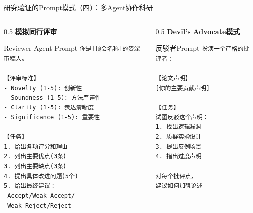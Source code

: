 \documentclass[aspectratio=169,11pt]{beamer}
\begin{document}
\begin{frame}[fragile]{研究验证的Prompt模式（四）：多Agent协作科研}
    \begin{columns}
        \begin{column}{0.5\textwidth}
            \textbf{模拟同行评审}
            \begin{exampleblock}{Reviewer Agent Prompt}
                \scriptsize
                \texttt{你是[顶会名称]的资深审稿人。}\\
                \texttt{}\\
                \texttt{【评审标准】}\\
                \texttt{- Novelty (1-5): 创新性}\\
                \texttt{- Soundness (1-5): 方法严谨性}\\
                \texttt{- Clarity (1-5): 表达清晰度}\\
                \texttt{- Significance (1-5): 重要性}\\
                \texttt{}\\
                \texttt{【任务】}\\
                \texttt{1. 给出各项评分和理由}\\
                \texttt{2. 列出主要优点(3条)}\\
                \texttt{3. 列出主要缺点(3条)}\\
                \texttt{4. 提出具体改进问题(5个)}\\
                \texttt{5. 给出最终建议：}\\
                \texttt{   Accept/Weak Accept/}\\
                \texttt{   Weak Reject/Reject}
            \end{exampleblock}
        \end{column}
        \begin{column}{0.5\textwidth}
            \textbf{Devil's Advocate模式}
            \begin{exampleblock}{反驳者Prompt}
                \scriptsize
                \texttt{扮演一个严格的批评者：}\\
                \texttt{}\\
                \texttt{【论文声明】}\\
                \texttt{[你的主要贡献声明]}\\
                \texttt{}\\
                \texttt{【任务】}\\
                \texttt{试图反驳这个声明：}\\
                \texttt{1. 找出逻辑漏洞}\\
                \texttt{2. 质疑实验设计}\\
                \texttt{3. 提出反例场景}\\
                \texttt{4. 指出过度声明}\\
                \texttt{}\\
                \texttt{对每个批评点，}\\
                \texttt{建议如何加强论述}
            \end{exampleblock}
            

\end{column}
\end{columns}
\end{frame}
\end{document}
